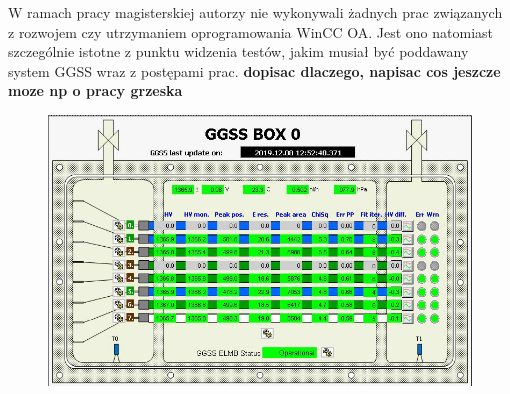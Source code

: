 W ramach pracy magisterskiej autorzy nie wykonywali żadnych prac związanych z rozwojem czy utrzymaniem oprogramowania WinCC OA. Jest ono natomiast szczególnie istotne z punktu widzenia testów, jakim musiał być poddawany system GGSS wraz z postępami prac. \textbf{dopisac dlaczego, napisac cos jeszcze moze np o pracy grzeska}


\begin{figure}[H]
\centering
\includegraphics[width=\textwidth]{components/ggss_images/winccoa_panel.png}
\caption{}
\label{fig:winccoa_panel_example}
\end{figure}

